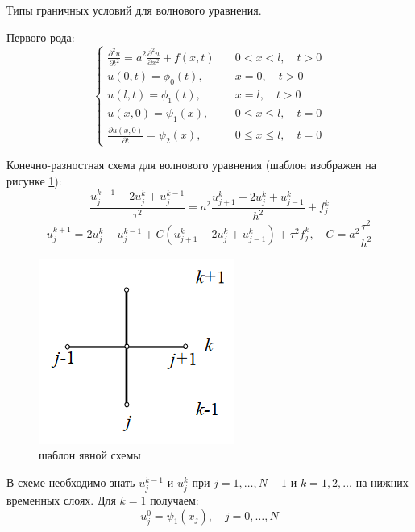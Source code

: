 \documentclass[a4paper, fontsize=14pt]{article}
\begin{document}
Типы граничных условий для волнового уравнения.

Первого рода:
\begin{equation}
  \begin{cases}
    \frac{\partial^2 u}{\partial t^2} = a^2 \frac{\partial^2 u}{\partial x^2} + f(x, t) \quad &0 < x < l, \quad t > 0 \\
    u(0, t) = \phi_0(t), & x = 0, \quad t > 0 \\
    u(l, t) = \phi_1(t), & x = l, \quad  t > 0 \\
    u(x, 0) = \psi_1(x), & 0 \leq x \leq l, \quad t = 0 \\
    \frac{\partial u(x, 0)}{\partial t} = \psi_2(x), & 0 \leq x \leq l, \quad  t = 0
  \end{cases}
\end{equation}

Конечно-разностная схема для волнового уравнения (шаблон изображен на рисунке \ref{fig:yavnaya_template}):
\begin{equation}
  \frac{u_j^{k+1} - 2 u_j^k + u_j^{k-1}}{\tau^2} = a^2 \frac{u_{j+1}^k - 2 u_j^k + u_{j-1}^k}{h^2} + f_j^k
\end{equation}
\begin{equation}
  u_j^{k+1} = 2 u_j^k - u_j^{k-1} + C ( u_{j+1}^k - 2 u_j^k + u_{j-1}^k )+ \tau^2 f_j^k, \quad C = a^2 \frac{\tau^2}{h^2}
\end{equation}
\begin{figure}[h!]
  \begin{center}
    \includegraphics{src/явная схема.png}
  \end{center}
  \caption[]{шаблон явной схемы}
  \label{fig:yavnaya_template}
\end{figure}

В схеме необходимо знать $u_j^{k-1}$ и $u_j^k$ при $j = 1, \dots, N-1$ и $k = 1, 2, \dots$ на нижних временных слоях.
Для $k=1$ получаем:
\begin{equation}
  u_j^0 = \psi_1(x_j), \quad j = 0, \dots, N
\end{equation}
\end{document}
